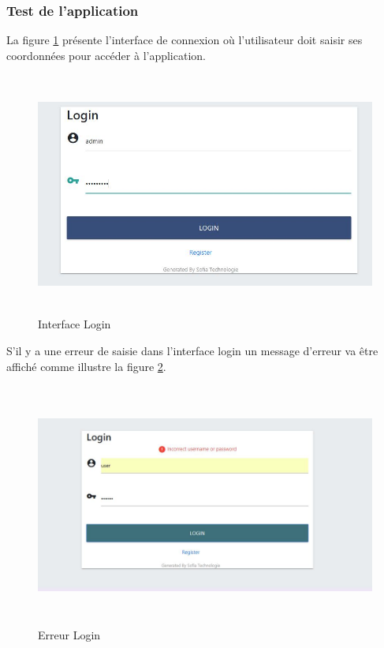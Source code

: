 \subsubsection{Test de l'application }  
La figure \ref{logintest} présente l’interface de connexion où l’utilisateur doit saisir ses coordonnées pour accéder
à l’application.  
\begin{figure} [H]
    \centering
         \begin{center}
             \includegraphics [width=16cm,height=8cm] {SprintImage/interfaceLogin.JPG}
            \caption{Interface Login}
            \label{logintest}
        \end{center}
    \end{figure}   
S’il y a une erreur de saisie dans l’interface login un message d’erreur va être affiché comme illustre la figure \ref{logintest1}.
\begin{figure} [H]
    \centering
         \begin{center}
             \includegraphics [width=16cm,height=8cm] {SprintImage/loginfailed.JPG}
            \caption{Erreur Login}
            \label{logintest1}
        \end{center}
    \end{figure}
